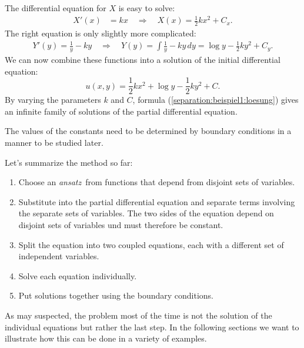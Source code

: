 The differential equation for $X$ is easy to solve:
\begin{align*}
X'(x)&=kx\quad\Rightarrow\quad X(x)=
\frac12kx^2+C_x.
\end{align*}
The right equation is only slightly more complicated:
\begin{align*}
Y'(y)=\frac1y-ky
\quad\Rightarrow\quad
Y(y)=\int\frac1y-ky\,dy=
\log y-\frac12ky^2+C_y.
\end{align*}
We can now combine these functions into a solution of the initial
differential equation:
\begin{equation}
u(x,y)=
\frac12kx^2+
\log y-\frac12ky^2+C.
\label{separation:beispiel1:loesung}
\end{equation}
By varying the parameters $k$ and $C$, formula
(\ref{separation:beispiel1:loesung}) gives an infinite family of
solutions of the partial differential equation.

The values of the constants need to be determined by boundary conditions
in a manner to be studied later.

Let's summarize the method so far:
\begin{enumerate}
\item
Choose an {\em ansatz} from functions that depend from disjoint
sets of variables.
\item
Substitute into the partial differential equation and separate terms
involving the separate sets of variables.
The two sides of the equation depend on disjoint sets of variables
und must therefore be constant.
\item 
Split the equation into two coupled equations, each with a
different set of independent variables.
\item
Solve each equation individually.
\item
Put solutions together using the boundary conditions.
\end{enumerate}
As may suspected, the problem most of the time is not the solution
of the individual equations but rather the last step.
In the following sections we want to illustrate how this can be
done in a variety of examples.

